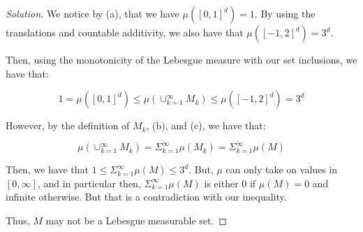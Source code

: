 \documentclass[10pt]{article}
\begin{document}
\begin{proof}[Solution]
We notice by (a), that we have $\mu([0,1]^d) = 1$. By using the translations and countable additivity, we also have that $\mu( [-1,2]^d) = 3^d$.

Then, using the monotonicity of the Lebesgue measure with our set inclusions, we have that:

$$ 1 = \mu([0,1]^d) \leq \mu(\cup_{k=1}^\infty M_k) \leq \mu( [-1,2]^d) = 3^d $$

However, by the definition of $M_k$, (b), and (c), we have that:

$$  \mu(\cup_{k=1}^\infty M_k) = \Sigma_{k=1}^\infty \mu(M_k) = \Sigma_{k=1}^\infty \mu(M) $$

Then, we have that $1 \leq \Sigma_{k=1}^\infty \mu(M) \leq 3^d$. But, $\mu$ can only take on values in $[0,\infty]$, and in particular then, $ \Sigma_{k=1}^\infty \mu(M)$ is either $0$ if $\mu(M) = 0$ and infinite otherwise. But that is a contradiction with our inequality.

Thus, $M$ may not be a Lebesgue measurable set. 


\end{proof}
\end{document}
